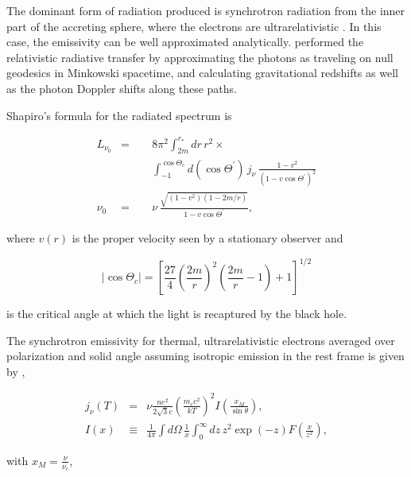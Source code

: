 \documentclass[apj]{emulateapj}
\begin{document}
The dominant form of radiation produced is synchrotron radiation from the inner part of the accreting sphere, where the electrons are ultrarelativistic \citep{shap2}. In this case, the emissivity can be well approximated analytically. \citet{shap1} performed the relativistic radiative transfer by approximating the photons as traveling on null geodesics in Minkowski spacetime, and calculating gravitational redshifts as well as the photon Doppler shifts along these paths. 

Shapiro's formula for the radiated spectrum is

\begin{eqnarray}\label{lint}
 L_{\nu_0} &=& 8 \pi^2 \int_{2m}^{r_*} dr\hspace{2pt} r^2 \times \nonumber\\ &\qquad&\int_{-1}^{\cos{\Theta_c}} d(\cos{\Theta^\prime}) \hspace{2pt} j_\nu \hspace{2pt} \frac{1-v^2}{(1-v\cos{\Theta^\prime})^2} \\
  \nu_0 &=& \nu \hspace{2pt} \frac{\sqrt{(1-v^2)(1-2m/r)}}{1-v\cos{\Theta^\prime}} \nonumber,
\end{eqnarray}

\noindent where $v(r)$ is the proper velocity seen by a stationary observer and

\begin{equation}
 \vert \cos{\Theta_c} \vert = \left [ \frac{27}{4} \left (\frac{2m}{r} \right)^2 \left (\frac{2m}{r}-1 \right)+1\right]^{1/2}
\end{equation}

\noindent is the critical angle at which the light is recaptured by the black hole.

The synchrotron emissivity for thermal, ultrarelativistic electrons averaged over polarization and solid angle assuming isotropic emission in the rest frame is given by \citep{pach},

\begin{eqnarray}
j_\nu(T) &=& \nu \frac{ne^2}{2\sqrt{3}c} \left ( \frac{m_e c^2}{kT}\right )^2 I\left ( \frac{x_M}{\sin{\theta}}\right ), \\
I(x) &\equiv& \frac{1}{4\pi} \int d\Omega \hspace{2pt}\frac{1}{x}\int_0^\infty dz\hspace{2pt} z^2 \exp(-z) F\left(\frac{x}{z^2}\right),
\end{eqnarray}

\noindent with $x_M = \frac{\nu}{\nu_c}$,
\end{document}
